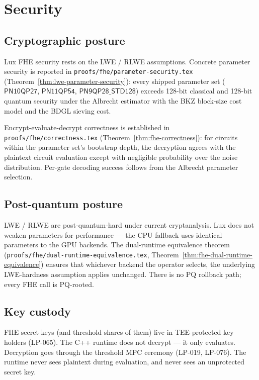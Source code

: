 \section{Security}
\label{sec:fhe-security}

\subsection{Cryptographic posture}

Lux FHE security rests on the LWE / RLWE assumptions. Concrete
parameter security is reported in
\texttt{proofs/fhe/parameter-security.tex}
(Theorem~\ref{thm:lwe-parameter-security}): every shipped parameter
set ($\mathsf{PN10QP27}$, $\mathsf{PN11QP54}$, $\mathsf{PN9QP28\_STD128}$)
exceeds 128-bit classical and 128-bit quantum security under the
Albrecht estimator with the BKZ block-size cost model and the BDGL
sieving cost.

Encrypt-evaluate-decrypt correctness is established in
\texttt{proofs/fhe/correctness.tex}
(Theorem~\ref{thm:fhe-correctness}): for circuits within the
parameter set's bootstrap depth, the decryption agrees with the
plaintext circuit evaluation except with negligible probability over
the noise distribution. Per-gate decoding success follows from the
Albrecht parameter selection.

\subsection{Post-quantum posture}

LWE / RLWE are post-quantum-hard under current cryptanalysis. Lux
does not weaken parameters for performance --- the CPU fallback uses
identical parameters to the GPU backends. The dual-runtime
equivalence theorem
(\texttt{proofs/fhe/dual-runtime-equivalence.tex},
Theorem~\ref{thm:fhe-dual-runtime-equivalence}) ensures that whichever
backend the operator selects, the underlying LWE-hardness assumption
applies unchanged. There is no PQ rollback path; every FHE call is
PQ-rooted.

\subsection{Key custody}

FHE secret keys (and threshold shares of them) live in TEE-protected
key holders (LP-065). The C++ runtime does not decrypt --- it only
evaluates. Decryption goes through the threshold MPC ceremony
(LP-019, LP-076). The runtime never sees plaintext during evaluation,
and never sees an unprotected secret key.

